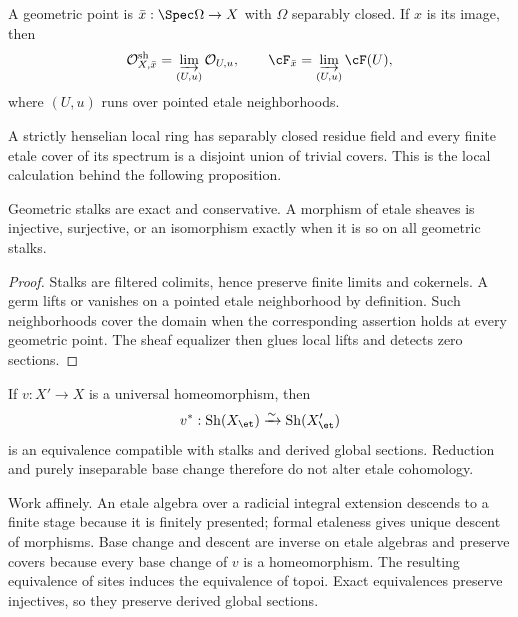 \begin{definition}
A geometric point is \(\bar x:\Spec\Omega\to X\) with \(\Omega\) separably
closed.  If \(x\) is its image, then
\[
 \mathcal O^{\mathrm{sh}}_{X,\bar x}
   =\varinjlim_{(U,u)}\mathcal O_{U,u},\qquad
 \cF_{\bar x}=\varinjlim_{(U,u)}\cF(U),
\]
where \((U,u)\) runs over pointed etale neighborhoods.
\end{definition}

A strictly henselian local ring has separably closed residue field and every
finite etale cover of its spectrum is a disjoint union of trivial covers.
This is the local calculation behind the following proposition.

\begin{proposition}
\label{prop:etale-enough-points}
Geometric stalks are exact and conservative.  A morphism of etale sheaves is
injective, surjective, or an isomorphism exactly when it is so on all
geometric stalks.
\end{proposition}

\begin{proof}
Stalks are filtered colimits, hence preserve finite limits and cokernels.  A
germ lifts or vanishes on a pointed etale neighborhood by definition.  Such
neighborhoods cover the domain when the corresponding assertion holds at
every geometric point.  The sheaf equalizer then glues local lifts and detects
zero sections.
\end{proof}

\begin{proposition}
\label{prop:universal-homeomorphism}
If \(v:X'\to X\) is a universal homeomorphism, then
\[
 v^*:\operatorname{Sh}(X_{\et})\xrightarrow{\sim}
      \operatorname{Sh}(X'_{\et})
\]
is an equivalence compatible with stalks and derived global sections.
Reduction and purely inseparable base change therefore do not alter etale
cohomology.
\end{proposition}

\begin{foundation}
Work affinely.  An etale algebra over a radicial integral extension descends
to a finite stage because it is finitely presented; formal etaleness gives
unique descent of morphisms.  Base change and descent are inverse on etale
algebras and preserve covers because every base change of \(v\) is a
homeomorphism.  The resulting equivalence of sites induces the equivalence of
topoi.  Exact equivalences preserve injectives, so they preserve derived
global sections.
\end{foundation}

